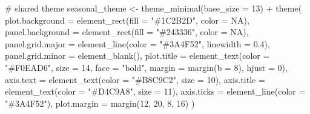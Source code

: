 \documentclass[
  letterpaper,
  DIV=11,
  numbers=noendperiod]{scrartcl}
\newenvironment{Shaded}{\begin{snugshade}}{\end{snugshade}}
\newcommand{\AttributeTok}[1]{\textcolor[rgb]{0.40,0.45,0.13}{#1}}
\newcommand{\CommentTok}[1]{\textcolor[rgb]{0.37,0.37,0.37}{#1}}
\newcommand{\ConstantTok}[1]{\textcolor[rgb]{0.56,0.35,0.01}{#1}}
\newcommand{\DecValTok}[1]{\textcolor[rgb]{0.68,0.00,0.00}{#1}}
\newcommand{\FloatTok}[1]{\textcolor[rgb]{0.68,0.00,0.00}{#1}}
\newcommand{\FunctionTok}[1]{\textcolor[rgb]{0.28,0.35,0.67}{#1}}
\newcommand{\NormalTok}[1]{\textcolor[rgb]{0.00,0.23,0.31}{#1}}
\newcommand{\OtherTok}[1]{\textcolor[rgb]{0.00,0.23,0.31}{#1}}
\newcommand{\SpecialCharTok}[1]{\textcolor[rgb]{0.37,0.37,0.37}{#1}}
\newcommand{\StringTok}[1]{\textcolor[rgb]{0.13,0.47,0.30}{#1}}
\begin{document}
\begin{Shaded}
\begin{Highlighting}[]
\CommentTok{\# shared theme}
\NormalTok{seasonal\_theme }\OtherTok{\textless{}{-}} \FunctionTok{theme\_minimal}\NormalTok{(}\AttributeTok{base\_size =} \DecValTok{13}\NormalTok{) }\SpecialCharTok{+}
  \FunctionTok{theme}\NormalTok{(}
    \AttributeTok{plot.background  =} \FunctionTok{element\_rect}\NormalTok{(}\AttributeTok{fill =} \StringTok{"\#1C2B2D"}\NormalTok{, }\AttributeTok{color =} \ConstantTok{NA}\NormalTok{),}
    \AttributeTok{panel.background =} \FunctionTok{element\_rect}\NormalTok{(}\AttributeTok{fill =} \StringTok{"\#243336"}\NormalTok{, }\AttributeTok{color =} \ConstantTok{NA}\NormalTok{),}
    \AttributeTok{panel.grid.major =} \FunctionTok{element\_line}\NormalTok{(}\AttributeTok{color =} \StringTok{"\#3A4F52"}\NormalTok{, }\AttributeTok{linewidth =} \FloatTok{0.4}\NormalTok{),}
    \AttributeTok{panel.grid.minor =} \FunctionTok{element\_blank}\NormalTok{(),}
    \AttributeTok{plot.title  =} \FunctionTok{element\_text}\NormalTok{(}\AttributeTok{color =} \StringTok{"\#F0EAD6"}\NormalTok{, }\AttributeTok{size =} \DecValTok{14}\NormalTok{, }\AttributeTok{face =} \StringTok{"bold"}\NormalTok{,}
                               \AttributeTok{margin =} \FunctionTok{margin}\NormalTok{(}\AttributeTok{b =} \DecValTok{8}\NormalTok{), }\AttributeTok{hjust =} \DecValTok{0}\NormalTok{),}
    \AttributeTok{axis.text   =} \FunctionTok{element\_text}\NormalTok{(}\AttributeTok{color =} \StringTok{"\#B8C9C2"}\NormalTok{, }\AttributeTok{size =} \DecValTok{10}\NormalTok{),}
    \AttributeTok{axis.title  =} \FunctionTok{element\_text}\NormalTok{(}\AttributeTok{color =} \StringTok{"\#D4C9A8"}\NormalTok{, }\AttributeTok{size =} \DecValTok{11}\NormalTok{),}
    \AttributeTok{axis.ticks  =} \FunctionTok{element\_line}\NormalTok{(}\AttributeTok{color =} \StringTok{"\#3A4F52"}\NormalTok{),}
    \AttributeTok{plot.margin =} \FunctionTok{margin}\NormalTok{(}\DecValTok{12}\NormalTok{, }\DecValTok{20}\NormalTok{, }\DecValTok{8}\NormalTok{, }\DecValTok{16}\NormalTok{)}
\NormalTok{  )}


\end{Highlighting}
\end{Shaded}
\end{document}
